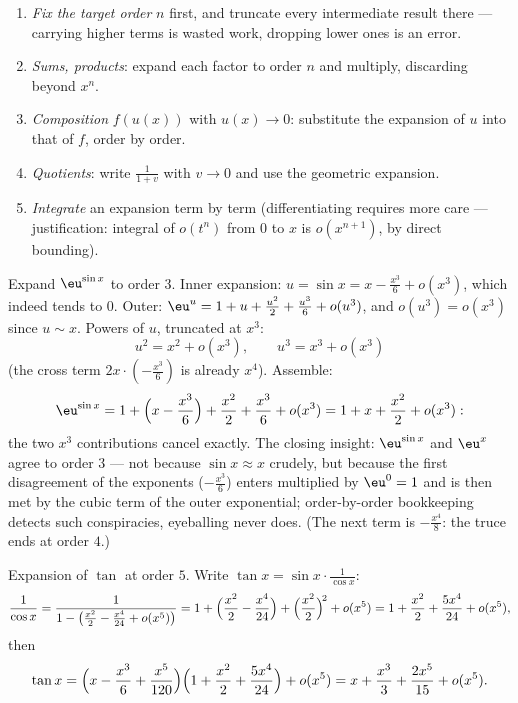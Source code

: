 \begin{method}\label{met:b1:taylor:compute}
\begin{enumerate}
  \item \emph{Fix the target order} $n$ first, and truncate every
        intermediate result there --- carrying higher terms is
        wasted work, dropping lower ones is an error.
  \item \emph{Sums, products}: expand each factor to order $n$ and
        multiply, discarding beyond $x^n$.
  \item \emph{Composition} $f(u(x))$ with $u(x) \to 0$: substitute
        the expansion of $u$ into that of $f$, order by order.
  \item \emph{Quotients}: write $\frac{1}{1 + v}$ with $v \to 0$ and
        use the geometric expansion.
  \item \emph{Integrate} an expansion term by term (differentiating
        requires more care --- justification: integral of $o(t^n)$
        from $0$ to $x$ is $o(x^{n+1})$, by direct bounding).
\end{enumerate}
\end{method}

\begin{example}\label{ex:b1:taylor:esin}
Expand $\eu^{\sin x}$ to order $3$. Inner expansion: $u = \sin x
= x - \frac{x^3}{6} + o(x^3)$, which indeed tends to $0$. Outer:
$\eu^u = 1 + u + \frac{u^2}{2} + \frac{u^3}{6} + o(u^3)$, and
$o(u^3) = o(x^3)$ since $u \sim x$. Powers of $u$, truncated at
$x^3$:
\[
u^2 = x^2 + o(x^3), \qquad u^3 = x^3 + o(x^3)
\]
(the cross term $2x\cdot(-\frac{x^3}{6})$ is already $x^4$).
Assemble:
\[
\eu^{\sin x} = 1 + \Bigl(x - \frac{x^3}{6}\Bigr) + \frac{x^2}{2}
+ \frac{x^3}{6} + o(x^3)
= 1 + x + \frac{x^2}{2} + o(x^3) :
\]
the two $x^3$ contributions cancel exactly. The closing insight:
$\eu^{\sin x}$ and $\eu^x$ agree to order $3$ --- not
because $\sin x \approx x$ crudely, but because the first
disagreement of the exponents ($-\frac{x^3}{6}$) enters
multiplied by $\eu^0 = 1$ and is then met by the cubic term of
the outer exponential; order-by-order bookkeeping detects such
conspiracies, eyeballing never does. (The next term is
$-\frac{x^4}{8}$: the truce ends at order $4$.)
\end{example}

\begin{example}\label{ex:b1:taylor:tan}
Expansion of $\tan$ at order $5$. Write $\tan x =
\sin x \cdot \frac{1}{\cos x}$:
\[
\frac{1}{\cos x} = \frac{1}{1 - \bigl(\frac{x^2}{2} - \frac{x^4}{24}
+ o(x^5)\bigr)}
= 1 + \Bigl(\frac{x^2}{2} - \frac{x^4}{24}\Bigr)
+ \Bigl(\frac{x^2}{2}\Bigr)^{\!2} + o(x^5)
= 1 + \frac{x^2}{2} + \frac{5x^4}{24} + o(x^5),
\]
then
\[
\tan x = \Bigl(x - \frac{x^3}{6} + \frac{x^5}{120}\Bigr)
\Bigl(1 + \frac{x^2}{2} + \frac{5x^4}{24}\Bigr) + o(x^5)
= x + \frac{x^3}{3} + \frac{2x^5}{15} + o(x^5) .
\]
\end{example}

